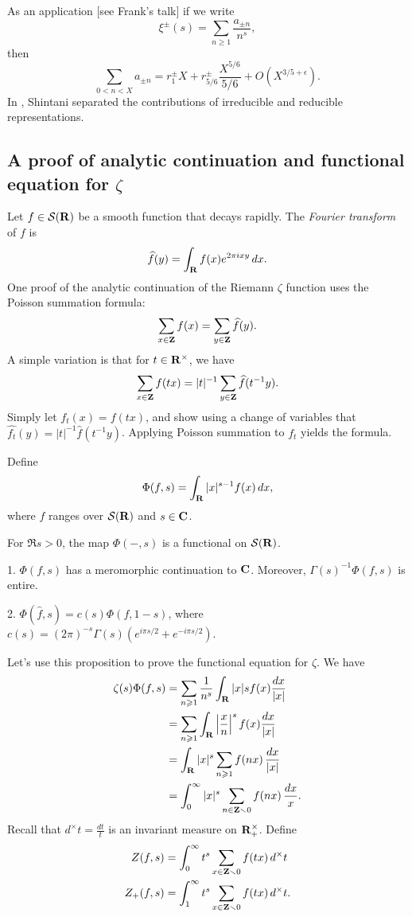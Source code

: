 As an application [see Frank's talk] if we write 
\[
  \xi^\pm(s) = \sum_{n\geqslant 1} \frac{a_{\pm n}}{n^s},
\]
then 
\[
  \sum_{0<n<X} a_{\pm n} = r_1^\pm X + r_{5/6}^\pm \frac{X^{5/6}}{5/6} + O(X^{3/5+\epsilon}) .
\]
In \cite{s75}, Shintani separated the contributions of irreducible and reducible 
representations. 





\subsection{A proof of analytic continuation and functional equation for \texorpdfstring{$\zeta$}{zeta}}

Let $f\in \mathcal{S}(\mathbf{R})$ be a smooth function that decays rapidly. The \emph{Fourier 
transform} of $f$ is 
\[
  \widehat f(y) = \int_{\mathbf{R}} f(x) e^{2\pi i x y}\, dx .
\]
One proof of the analytic continuation of the Riemann $\zeta$ function uses the 
Poisson summation formula: 
\[
  \sum_{x\in \mathbf{Z}} f(x) = \sum_{y\in \mathbf{Z}} \widehat f(y) .
\]
A simple variation is that for $t\in \mathbf{R}^\times$, we have 
\[
  \sum_{x\in \mathbf{Z}} f(t x) = |t|^{-1} \sum_{y\in \mathbf{Z}} \widehat f(t^{-1} y) .
\]
Simply let $f_t(x) =f (t x)$, and show using a change of variables that 
$\widehat{f_t}(y) = |t|^{-1} \widehat f(t^{-1} y)$. Applying Poisson summation 
to $f_t$ yields the formula. 

\begin{defi}
Define 
\[
  \Phi(f,s) = \int_{\mathbf{R}} |x|^{s-1} f(x)\, dx ,
\]
where $f$ ranges over $\mathcal{S}(\mathbf{R})$ and $s\in \mathbf{C}$. 
\end{defi}

For $\Re s>0$, the map $\Phi(-,s)$ is a functional on $\mathcal{S}(\mathbf{R})$. 

\begin{prop}
1. $\Phi(f,s)$ has a meromorphic continuation to $\mathbf{C}$. Moreover, 
$\Gamma(s)^{-1} \Phi(f,s)$ is entire. 

2. $\Phi(\widehat f,s) = c(s) \Phi(f,1-s)$, where 
$c(s) = (2\pi)^{-s} \Gamma(s) (e^{i\pi s/2} + e^{-i\pi s/2})$. 
\end{prop}

Let's use this proposition to prove the functional equation for $\zeta$. 
We have 
\begin{align*}
  \zeta(s) \Phi(f,s) 
    &= \sum_{n\geqslant 1} \frac{1}{n^s} \int_{\mathbf{R}} |x|s f(x) \frac{dx}{|x|} \\
    &= \sum_{n\geqslant 1} \int_{\mathbf{R}} \left|\frac x n\right|^s f(x) \frac{dx}{|x|} \\
    &= \int_{\mathbf{R}} |x|^s \sum_{n\geqslant 1} f(n x) \, \frac{dx}{|x|} \\
    &= \int_0^\infty |x|^s \sum_{n\in \mathbf{Z}\smallsetminus 0} f(n x)\, \frac{dx}{x} .
\end{align*}
Recall that $d^\times t = \frac{dt}{t}$ is an invariant measure on 
$\mathbf{R}^\times_+$. Define 
\begin{align*}
  Z(f,s) &= \int_0^\infty t^s \sum_{x\in \mathbf{Z}\smallsetminus 0} f(t x)\, d^\times t \\
  Z_+(f,s) &= \int_1^\infty t^s \sum_{x\in \mathbf{Z}\smallsetminus 0} f(t x) \, d^\times t .
\end{align*}

